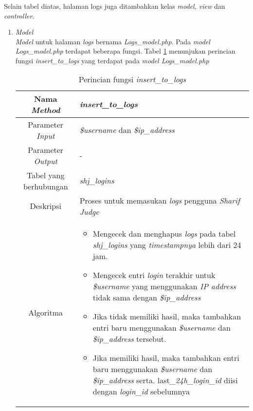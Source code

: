 Selain tabel diatas, halaman logs juga ditambahkan kelas \textit{model, view} dan \textit{controller}.
\begin{enumerate}
	\item \textit{Model} \\
	\textit{Model} untuk halaman \textit{logs} bernama \textit{Logs\_model.php}. Pada \textit{model Logs\_model.php} terdapat beberapa fungsi. Tabel \ref{tab:f1logs} menunjukan perincian fungsi \textit{insert\_to\_logs} yang terdapat pada \textit{model Logs\_model.php}
	\begin{table}[H]
		\caption{Perincian fungsi \textit{insert\_to\_logs}}
		\label{tab:f1logs}
		\begin{tabular}{|c|p{11cm}|}
			\hline
			Nama \textit{Method} 	& 	\textit{insert\_to\_logs} 	\\
			\hline
			Parameter \textit{Input} & \textit{\$username} dan \textit{\$ip\_address} \\
			\hline
			Parameter \textit{Output} & -\\
			\hline
			Tabel yang berhubungan & \textit{shj\_logins} \\
			\hline
			Deskripsi	& Proses untuk memasukan \textit{logs} pengguna \textit{Sharif Judge} \\
			\hline
			Algoritma	& \begin{itemize}
				\item Mengecek dan menghapus \textit{logs} pada tabel \textit{shj\_logins} yang \textit{timestampnya} lebih dari 24 jam.
				\item Mengecek entri \textit{login} terakhir untuk \textit{\$username} yang  menggunakan \textit{IP address} tidak sama dengan \textit{\$ip\_address}
				\item Jika tidak memiliki hasil, maka tambahkan entri baru menggunakan \textit{\$username} dan \textit{\$ip\_address} tersebut.
				\item Jika memiliki hasil,  maka tambahkan entri baru menggunakan \textit{\$username} dan \textit{\$ip\_address} serta. last\textit{\_24h\_login\_id} diisi dengan \textit{login\_id} sebelumnya
			\end{itemize} \\
			\hline
		\end{tabular}
	\end{table}


\end{enumerate}

